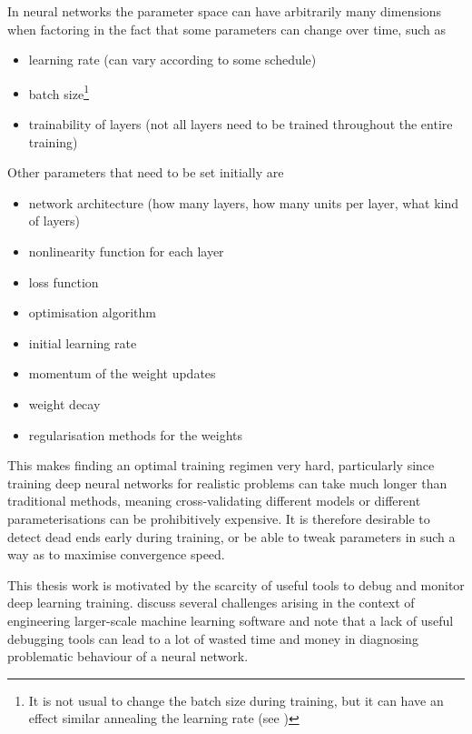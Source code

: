 In neural networks the parameter space can have arbitrarily many dimensions when
factoring in the fact that some parameters can change over time, such as

\begin{itemize}
    \item
        learning rate (can vary according to some schedule)
    \item
        batch size\footnote{It is not usual to change the batch size during
            training, but it can have an effect similar annealing the learning
        rate (see \cite{DBLP:journals/corr/abs-1711-00489})}
    \item
        trainability of layers (not all layers need to be trained throughout the
        entire training)
\end{itemize}

Other parameters that need to be set initially are

\begin{itemize}
    \item
        network architecture (how many layers, how many units per layer,
        what kind of layers)
    \item
        nonlinearity function for each layer
    \item
        loss function
    \item
        optimisation algorithm
    \item
        initial learning rate
    \item
        momentum of the weight updates
    \item
        weight decay
    \item
        regularisation methods for the weights
\end{itemize}

This makes finding an optimal training regimen very hard, particularly since
training deep neural networks for realistic problems can take much longer than
traditional methods, meaning cross-validating different models or different
parameterisations can be prohibitively expensive. It is therefore desirable to
detect dead ends early during training, or be able to tweak parameters in such a
way as to maximise convergence speed.

This thesis work is motivated by the scarcity of useful tools to debug and
monitor deep learning training. \citet{arpteg2018software} discuss several
challenges arising in the context of engineering larger-scale machine learning
software and note that a lack of useful debugging tools can lead to a lot of
wasted time and money in diagnosing problematic behaviour of a neural network.


